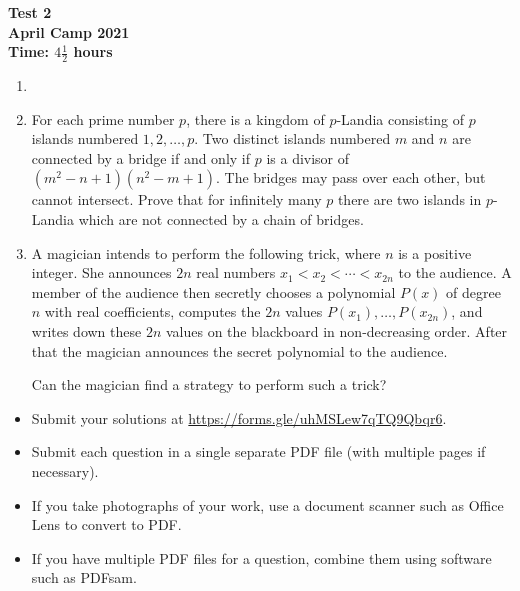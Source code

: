 \documentclass{article}
\begin{document}
\thispagestyle{empty}

\begin{center}
  \textbf{\Large Test 2}
  \\ \vspace{1em}
  \textbf{\large April Camp 2021}
  \\ \vspace{1em}
  \textbf{\large Time: $4\frac{1}{2}$ hours}
\end{center}

\vspace{24pt}

\begin{enumerate}[itemsep=18pt]

\item


\item %
For each prime number $p$, there is a kingdom of $p$-Landia consisting of $p$ islands numbered $1, 2, \dotsc, p$.
Two distinct islands numbered $m$ and $n$ are connected by a bridge if and only if $p$ is a divisor of $(m^2-n+1) (n^2-m+1)$.
The bridges may pass over each other, but cannot intersect.
Prove that for infinitely many $p$ there are two islands in $p$-Landia which are not connected by a chain of bridges.


\item %
A magician intends to perform the following trick, where $n$ is a positive integer.
She announces $2n$ real numbers $x_1 < x_2 < \dotsb < x_{2n}$ to the audience.
A member of the audience then secretly chooses a polynomial $P(x)$ of degree $n$ with real coefficients, computes the $2n$ values $P(x_1), \dotsc, P(x_{2n})$, and writes down these $2n$ values on the blackboard in non-decreasing order.
After that the magician announces the secret polynomial to the audience.

Can the magician find a strategy to perform such a trick?

\end{enumerate}


\vfill
\begin{itemize}
	\item Submit your solutions at \url{https://forms.gle/uhMSLew7qTQ9Qbqr6}.
	\item Submit each question in a single separate PDF file (with multiple pages if necessary).
	\item If you take photographs of your work, use a document scanner such as Office Lens to convert to PDF.
	\item If you have multiple PDF files for a question, combine them using software such as PDFsam.
\end{itemize}
\end{document}
